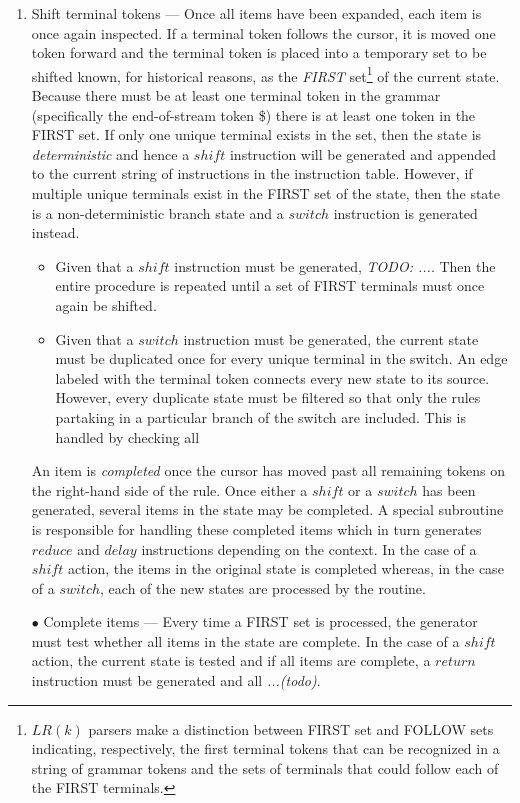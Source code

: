 \documentclass[a4paper,11pt]{article}
\begin{document}
\begin{enumerate}
\item Shift terminal tokens --- Once all items have been expanded, each item is once again inspected. 
If a terminal token follows the cursor, it is moved one token forward and the terminal token is placed into a temporary set to be shifted 
known, for historical reasons, 
as the \emph{FIRST} set\footnote{$LR(k)$ parsers make a distinction between FIRST set and FOLLOW sets indicating, respectively, 
the first terminal tokens that can be recognized in a string of grammar tokens and the sets of terminals that could follow each of the FIRST terminals.} of the current state.
Because there must be at least one terminal token in the grammar (specifically the end-of-stream token \$) there is at least one token in the FIRST set.
If only one unique terminal exists in the set, then the state is \emph{deterministic} and hence a $shift$ instruction will be generated and appended to the current string of instructions in the instruction table.
However, if multiple unique terminals exist in the FIRST set of the state, then the state is a non-deterministic branch state and a $switch$ instruction is generated instead.
\begin{itemize}
\item Given that a $shift$ instruction must be generated, \emph{TODO: ...}. Then the entire procedure is repeated until a set of FIRST terminals must once again be shifted.
\item Given that a $switch$ instruction must be generated, the current state must be duplicated once for every unique terminal in the switch. 
An edge labeled with the terminal token connects every new state to its source.
However, every duplicate state must be filtered so that only the rules partaking in a particular branch of the switch are included.
This is handled by checking all 
\end{itemize}
An item is \emph{completed} once the cursor has moved past all remaining tokens on the right-hand side of the rule.
Once either a $shift$ or a $switch$ has been generated, several items in the state may be completed. 
A special subroutine is responsible for handling these completed items which in turn generates $reduce$ and $delay$ instructions depending on the context.
In the case of a $shift$ action, the items in the original state is completed whereas, in the case of a $switch$, each of the new states are processed by the routine.\\

\item[$\bullet$] Complete items --- Every time a FIRST set is processed, the generator must test whether all items in the state are complete. 
In the case of a $shift$ action, the current state is tested and if all items are complete, a $return$ instruction must be generated and all \emph{...(todo)}.
\end{enumerate}
\end{document}
